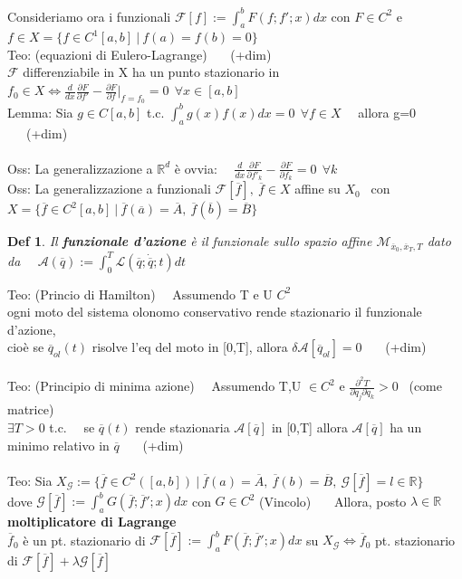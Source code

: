 \documentclass{article}
\theoremstyle{unnumbered}
\newtheorem* {theoremT}{Def}
\theoremstyle{unnumbered1}
\newenvironment{defi}{\begin{gBox}\begin{theoremT}}{\end{theoremT}\end{gBox}}
\begin{document}
%
%
%
Consideriamo ora i funzionali $\mathcal{F}[f]:=\int_a^bF(f;f';x)dx$ con $F\in C^2$ e $f\in X=\{f\in C^1[a,b] \ |\ f(a)=f(b)=0 \}$\\
%
Teo: (equazioni di Eulero-Lagrange) \ \ \ (+dim)\\
$\mathcal{F}$ differenziabile in X ha un punto stazionario in $f_0\in X \Longleftrightarrow \frac{d}{dx}\frac{\partial F}{\partial f'}-\frac{\partial F}{\partial f}|_{f=f_0}=0 \ \ \forall x \in [a,b]$ \\
Lemma: Sia $g\in C[a,b]$ t.c. $\int_a^bg(x)f(x)dx=0 \ \ \forall f\in X$ \ \ allora g=0 \ \ \ (+dim)\\ \\
%
%
%
Oss: La generalizzazione a $\mathbb{R}^d$ è ovvia: \ \ $\frac{d}{dx}\frac{\partial F}{\partial f'_k}-\frac{\partial F}{\partial f_k}=0 \ \ \forall k $\\
%
Oss: La generalizzazione a funzionali $\mathcal{F}[\overline{f}], \ \overline{f}\in X$ affine su $X_0$ \ con $X=\{\overline{f}\in C^2[a,b] \ |\ \overline{f}(\overline{a})=\overline{A}, \ \overline{f}(\overline{b})=\overline{B}\}$ \\
%
%
%
\begin{defi}
Il \textbf{funzionale d'azione} è il funzionale sullo spazio affine $\mathcal{M}_{\overline{x}_0,\overline{x}_T,T}$ dato da \ \ $\mathcal{A}(\overline{q}):=\int_0^T\mathcal{L}(\overline{q};\dot{\overline{q}};t)dt$
\end{defi}
%
Teo: (Princio di Hamilton) \ \
Assumendo T e U $C^2$ \\ ogni moto del sistema olonomo conservativo rende stazionario il funzionale d'azione,\\ cioè se $\overline{q}_{ol}(t) $ risolve l'eq del moto in [0,T], allora $\delta\mathcal{A}[\overline{q}_{ol}]=0$ \ \ \ (+dim) \\ \\
%
%
%
Teo: (Principio di minima azione) \ \ Assumendo T,U $\in C^2$ e $\frac{\partial^2T}{\partial\dot{q}_j\partial\dot{q}_k}>0$ \ (come matrice) \\
$\exists T>0 $ t.c. \ \ se $\overline{q}(t)$ rende stazionaria $\mathcal{A}[\overline{q}]$ in [0,T]
allora $\mathcal{A}[\overline{q}]$ ha un minimo relativo in $\overline{q}$  \ \ \ (+dim)\\ \\
%
%
%
Teo: Sia $X_{\mathcal{G}}:=\{ \overline{f}\in C^2([a,b]) \ |\ \overline{f}(a)=\overline{A}, \ \overline{f}(b)=\overline{B}, \ \mathcal{G}[\overline{f}]=l \in \mathbb{R} \}$ \\
\phantom{Teo: }dove $\mathcal{G}[\overline{f}]:=\int_a^bG(\overline{f};\overline{f}';x)dx$ con $G\in C^2$ (Vincolo) \ \ \
Allora, posto $\lambda\in\mathbb{R}$ \textbf{moltiplicatore di Lagrange} \\
\phantom{Teo: }$\overline{f}_0$ è un pt.\! stazionario di $\mathcal{F}[\overline{f}]:=\int_a^bF(\overline{f};\overline{f}';x)dx$ su $X_{\mathcal{G}} \Longleftrightarrow \overline{f}_0$ pt.\! stazionario di $\mathcal{F}[\overline{f}]+\lambda\mathcal{G}[\overline{f}] $
\end{document}
